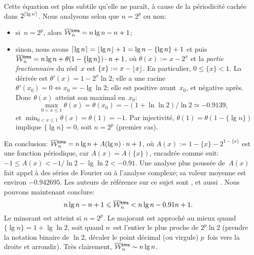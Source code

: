 Cette équation est plus subtile qu'elle ne paraît, à cause de la
périodicité cachée dans \(2^{\lceil{\lg n}\rceil}\). Nous analysons selon
que \(n = 2^p\) ou non:
\begin{itemize}

  \item si~\(n=2^p\), alors \(\OW{\fun{tms}}{n} = n\lg n - n + 1\);

  \item sinon, nous avons \(\lceil{\lg n}\rceil = \lfloor{\lg n}\rfloor + 1 = \lg
    n - \{\lg n\} + 1\) et puis \(\OW{\fun{tms}}{n} = n\lg n +
    \theta(1 - \{\lg n\}) \cdot n + 1\), où \(\theta(x) := x - 2^x\)
    et la \emph{partie fractionnaire} du réel~\(x\) est \(\{x\} := x - \lfloor{x}\rfloor\). En
    particulier, \(0 \leqslant \{x\} < 1\). La dérivée est
    \(\theta'(x) = 1 - 2^x\ln 2\); elle a une racine \(\theta'(x_0) =
    0 \Leftrightarrow x_0 = -\lg\ln 2\); elle est positive
    avant~\(x_0\), et négative après.  Donc \(\theta(x)\) atteint son
    maximal en~\(x_0\):
    \begin{equation*}
      \max_{0<x\leqslant 1}\theta(x) = \theta(x_0)
      = -(1+\ln\ln{2})/\!\ln{2} \simeq -0.9139,
    \end{equation*}
    et \(\min_{0<x\leqslant 1}\theta(x) = \theta(1) = -1\). Par
    injectivité, \(\theta(1) = \theta(1-\{\lg n\})\) implique \(\{\lg
    n\} = 0\), soit \(n=2^p\) (premier cas).
\end{itemize}
En conclusion: \(\OW{\fun{tms}}{n} = n\lg n + A(\lg n) \cdot n + 1\),
où \(A(x) := 1 - \{x\} - 2^{1 - \{x\}}\) est une fonction périodique,
car \(A(x) = A(\{x\})\), encadrée comme suit: \(-1 \leqslant A(x) <
-1/\!\ln 2 - \lg\ln 2 < -0.91\). Une analyse plus poussée de~\(A(x)\)
fait appel à des séries de Fourier ou à l'analyse complexe; sa valeur
moyenne est environ \(-0.942695\). Les auteurs de référence sur ce
sujet sont \cite{FlajoletGolin_1994}, et aussi
\cite{PannyProdinger_1995}. Nous pouvons maintenant conclure:
\begin{equation}
n\lg n - n + 1 \leqslant \OW{\fun{tms}}{n} <
n\lg n - 0.91 n + 1.\label{ineq:OWtms}
\end{equation}
Le minorant est atteint si \(n=2^p\). Le majorant est approché au
mieux quand \(\{\lg n\} = 1 + \lg\ln 2\), soit quand \(n\)~est
l'entier le plus proche de \(2^p\ln 2\) (prendre la notation binaire
de \(\ln 2\), décaler le point décimal (ou virgule) \(p\)~fois vers la
droite et arrondir). Très clairement, \(\OW{\fun{tms}}{n} \sim n\lg
n\). 

